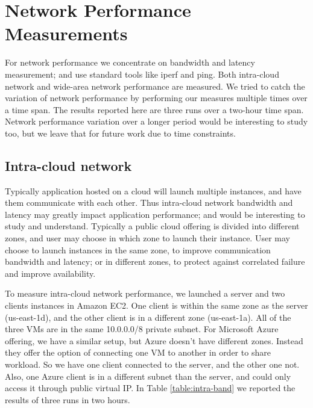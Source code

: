 \section{Network Performance Measurements}
\label{section:networks} 

For network performance we concentrate on bandwidth and latency measurement; and use standard tools like iperf and ping. Both intra-cloud network and wide-area network performance are measured. We tried to catch the variation of network performance by performing our measures multiple times over a time span. The results reported here are three runs over a two-hour time span. Network performance variation over a longer period would be interesting to study too, but we leave that for future work due to time constraints.

\subsection{Intra-cloud network}
\label{subsection:intracloud}

Typically application hosted on a cloud will launch multiple instances, and have them communicate with each other. Thus intra-cloud network bandwidth and latency may greatly impact application performance; and would be interesting to study and understand. Typically a public cloud offering is divided into different zones, and user may choose in which zone to launch their instance. User may choose to launch instances in the same zone, to improve communication bandwidth and latency; or in different zones, to protect against correlated failure and improve availability. 

To measure intra-cloud network performance, we launched a server and two clients instances in Amazon EC2. One client is within the same zone as the server (us-east-1d), and the other client is in a different zone (us-east-1a). All of the three VMs are in the same 10.0.0.0/8 private subnet. For Microsoft Azure offering, we have a similar setup, but Azure doesn't have different zones. Instead they offer the option of connecting one VM to another in order to share workload. So we have one client connected to the server, and the other one not. Also, one Azure client is in a different subnet than the server, and could only access it through public virtual IP. In Table \ref{table:intra-band} we reported the results of three runs in two hours.

